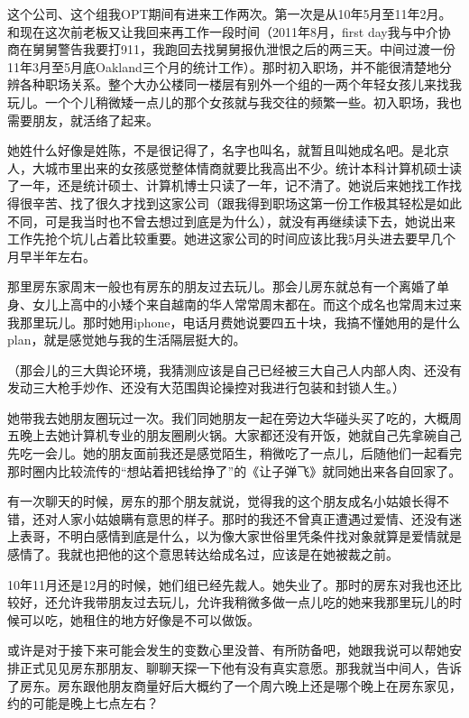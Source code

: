 \documentclass[9pt, b5paper]{article}
\begin{document}
这个公司、这个组我OPT期间有进来工作两次。第一次是从10年5月至11年2月。和现在这次前老板又让我回来再工作一段时间（2011年8月，first day我与中介协商在舅舅警告我要打911，我跑回去找舅舅报仇泄恨之后的两三天。中间过渡一份11年3月至5月底Oakland三个月的统计工作）。那时初入职场，并不能很清楚地分辨各种职场关系。整个大办公楼同一楼层有别外一个组的一两个年轻女孩儿来找我玩儿。一个个儿稍微矮一点儿的那个女孩就与我交往的频繁一些。初入职场，我也需要朋友，就活络了起来。

她姓什么好像是姓陈，不是很记得了，名字也叫名，就暂且叫她成名吧。是北京人，大城市里出来的女孩感觉整体情商就要比我高出不少。统计本科计算机硕士读了一年，还是统计硕士、计算机博士只读了一年，记不清了。她说后来她找工作找得很辛苦、找了很久才找到这家公司（跟我得到职场这第一份工作极其轻松是如此不同，可是我当时也不曾去想过到底是为什么），就没有再继续读下去，她说出来工作先抢个坑儿占着比较重要。她进这家公司的时间应该比我5月头进去要早几个月早半年左右。

那里房东家周末一般也有房东的朋友过去玩儿。那会儿房东就总有一个离婚了单身、女儿上高中的小矮个来自越南的华人常常周末都在。而这个成名也常周末过来我那里玩儿。那时她用iphone，电话月费她说要四五十块，我搞不懂她用的是什么plan，就是感觉她与我的生活隔层挺大的。 

（那会儿的三大舆论环境，我猜测应该是自己已经被三大自己人内部人肉、还没有发动三大枪手炒作、还没有大范围舆论操控对我进行包装和封锁人生。）

她带我去她朋友圈玩过一次。我们同她朋友一起在旁边大华碰头买了吃的，大概周五晚上去她计算机专业的朋友圈刷火锅。大家都还没有开饭，她就自己先拿碗自己先吃一会儿。她的朋友面前我还是感觉陌生，稍微吃了一点儿，后随他们一起看完那时圈内比较流传的“想站着把钱给挣了”的《让子弹飞》就同她出来各自回家了。 

有一次聊天的时候，房东的那个朋友就说，觉得我的这个朋友成名小姑娘长得不错，还对人家小姑娘瞒有意思的样子。那时的我还不曾真正遭遇过爱情、还没有迷上表哥，不明白感情到底是什么，以为像大家世俗里凭条件找对象就算是爱情就是感情了。我就也把他的这个意思转达给成名过，应该是在她被裁之前。

10年11月还是12月的时候，她们组已经先裁人。她失业了。那时的房东对我也还比较好，还允许我带朋友过去玩儿，允许我稍微多做一点儿吃的她来我那里玩儿的时候可以吃，她租住的地方好像是不可以做饭。 

或许是对于接下来可能会发生的变数心里没普、有所防备吧，她跟我说可以帮她安排正式见见房东那朋友、聊聊天探一下他有没有真实意愿。那我就当中间人，告诉了房东。房东跟他朋友商量好后大概约了一个周六晚上还是哪个晚上在房东家见，约的可能是晚上七点左右？
\end{document}
